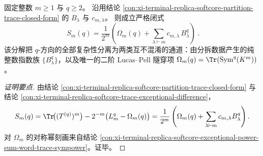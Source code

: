 \begin{conclusion}\label{con:xi-terminal-replica-softcore-partition-exceptional-closed-form}
固定整数 \(m\ge 1\) 与 \(q\ge 2\)。
沿用结论 \ref{con:xi-terminal-replica-softcore-partition-trace-closed-form} 的 \(B_\lambda\) 与 \(c_{m,\lambda}\)。
则成立严格闭式
\[
\boxed{\;
S_m(q)
=\frac1{2^m}\left(\Omega_m(q)+\sum_{\lambda\vdash m}c_{m,\lambda}\,B_\lambda^{q}\right)\; } .
\]
该分解把 \(q\)-方向的全部复杂性分离为两类互不混淆的通道：由分拆数据产生的纯整数指数族 \(\{B_\lambda^q\}\)，以及唯一的二阶 Lucas--Pell 隧穿项 \(\Omega_m(q)=\Tr(\mathrm{Sym}^q(K^m))\)。
\end{conclusion}
\begin{proof}[证明要点]
由结论 \ref{con:xi-terminal-replica-softcore-partition-trace-closed-form} 与结论 \ref{con:xi-terminal-replica-softcore-trace-exceptional-difference}，
\[
S_m(q)
=\Tr\!\bigl((T^{(q)})^m\bigr)-2^{-m}\bigl(L_m^{q}-\Omega_m(q)\bigr)
=\frac1{2^m}\left(\Omega_m(q)+\sum_{\lambda\vdash m}c_{m,\lambda}B_\lambda^q\right).
\]
对 \(\Omega_m\) 的对称幂刻画来自结论 \ref{con:xi-terminal-replica-softcore-exceptional-power-sum-word-trace-sympower}。证毕。
\end{proof}

